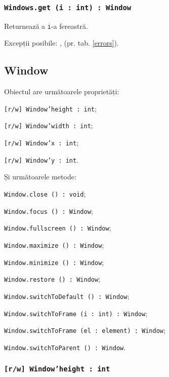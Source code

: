 \subsubsection{\texttt{Windows.get (i : int) : Window}}

Returnează a \texttt{i}-a fereastră.

Excepții posibile: ,  (pr. tab. \ref{errors}).

\subsection{{\color{orange} Window}}

Obiectul \window{} are următoarele proprietăți:
\begin{icItems}
	\item \texttt{[r/w] Window'height : int};
	\item \texttt{[r/w] Window'width : int};
	\item \texttt{[r/w] Window'x : int};
	\item \texttt{[r/w] Window'y : int}.
\end{icItems}

Și următoarele metode:
\begin{icItems}
	\item \texttt{Window.close () : void};
	\item \texttt{Window.focus () : Window};
	\item \texttt{Window.fullscreen () : Window};
	\item \texttt{Window.maximize () : Window};
	\item \texttt{Window.minimize () : Window};
	\item \texttt{Window.restore () : Window};
	\item \texttt{Window.switchToDefault () : Window};
	\item \texttt{Window.switchToFrame (i : int) : Window};
	\item \texttt{Window.switchToFrame (el : element) : Window};
	\item \texttt{Window.switchToParent () : Window}.
\end{icItems}

\subsubsection{\texttt{[r/w] Window'height : int}}

